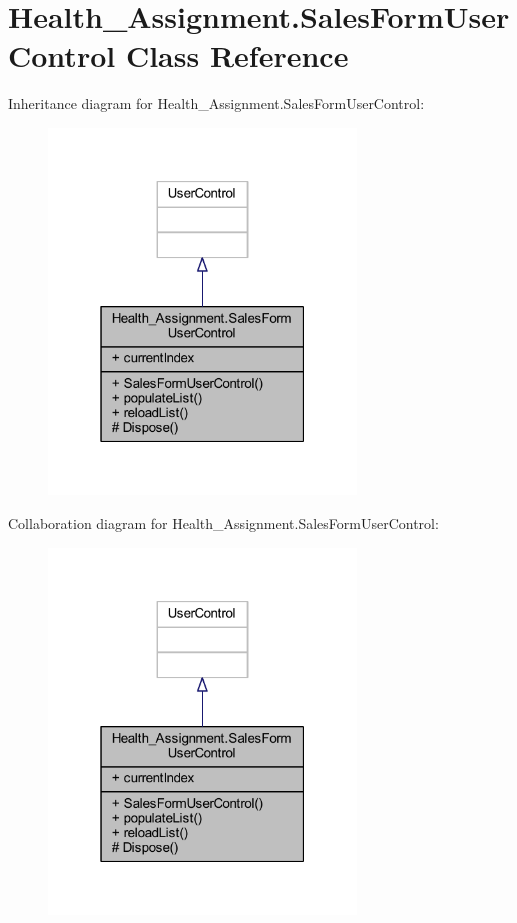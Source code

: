 \hypertarget{class_health___assignment_1_1_sales_form_user_control}{}\section{Health\+\_\+\+Assignment.\+Sales\+Form\+User\+Control Class Reference}
\label{class_health___assignment_1_1_sales_form_user_control}


Inheritance diagram for Health\+\_\+\+Assignment.\+Sales\+Form\+User\+Control\+:\nopagebreak
\begin{figure}[H]
\begin{center}
\leavevmode
\includegraphics[width=232pt]{class_health___assignment_1_1_sales_form_user_control__inherit__graph}
\end{center}
\end{figure}


Collaboration diagram for Health\+\_\+\+Assignment.\+Sales\+Form\+User\+Control\+:\nopagebreak
\begin{figure}[H]
\begin{center}
\leavevmode
\includegraphics[width=232pt]{class_health___assignment_1_1_sales_form_user_control__coll__graph}
\end{center}
\end{figure}
